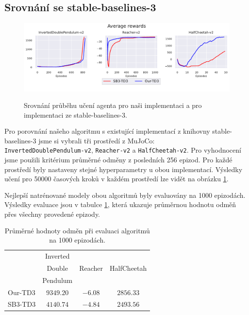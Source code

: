 \subsection{Srovnání se stable-baselines-3}

\begin{figure}[ht]\centering %
  \centering
  \includegraphics[width=\linewidth]{images/comparison_all.pdf}\\[1pt]
  \caption{Srovnání průběhu učení agenta pro naši implementaci a pro implementaci ze stable-baselines-3.}
  \label{fig:srovnani}
\end{figure}

Pro porovnání našeho algoritmu s existující implementací z knihovny stable-baselines-3 jsme si vybrali tři prostředí z MuJoCo:\\ \texttt{InvertedDoublePendulum-v2}, \texttt{Reacher-v2} a \texttt{HalfCheetah-v2}. Pro vyhodnocení jsme použili kritérium průměrné odměny z posledních 256 epizod. Pro každé prostředí byly nastaveny stejné hyperparametry u obou implementací. Výsledky učení pro 50000 časových kroků v každém prostředí lze vidět na obrázku \ref{fig:srovnani}.

Nejlepší natrénované modely obou algoritmů byly evaluovány na 1000 epizodách. Výsledky evaluace jsou v tabulce \ref{tab:srovnani_evaluace}, která ukazuje průměrnou hodnotu odměň přes všechny provedené epizody.

\begin{table}[h]
	\centering
	\begin{tabular}{| l | c | c | c | }
		\hline
	    
		& Inverted & & \\
		& Double & Reacher & HalfCheetah\\
		& Pendulum & & \\
		\hline
		Our-TD3 & $9349.20$ & $-6.08$ & $2856.33$ \\
        \hline
		SB3-TD3 & $4140.74$ & $-4.84$ & $2493.56$ \\
		\hline
	\end{tabular}
	\caption{Průměrné hodnoty odměn při evaluaci algoritmů na 1000 epizodách.}
	\label{tab:srovnani_evaluace}
\end{table}


